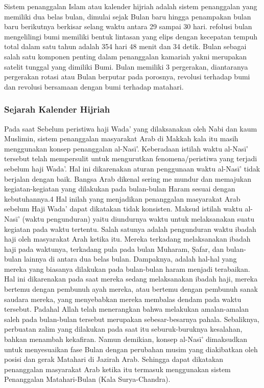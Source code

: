   Sistem penanggalan Islam atau kalender hijriah adalah sistem penanggalan yang memiliki dua belas bulan, dimulai sejak Bulan baru hingga penampakan bulan baru berikutnya berkisar selang waktu antara 29 sampai 30 hari. refolusi bulan mengelilingi bumi memiliki bentuk lintasan yang elips dengan kecepatan tempuh total dalam satu tahun adalah 354 hari 48 menit dan 34 detik.
  Bulan sebagai salah satu komponen penting dalam penanggalan kamariah yakni merupakan satelit tunggal yang dimiliki Bumi. Bulan memiliki 3 pergerakan, diantaranya pergerakan rotasi atau Bulan berputar pada porosnya, revolusi terhadap bumi dan revolusi bersamaan dengan bumi terhadap matahari.

    \subsubsection{Sejarah Kalender Hijriah}\cite{setyanto2015kriteria}
      Pada saat Sebelum peristiwa haji Wada’ yang dilaksanakan oleh Nabi dan kaum Muslimin, sistem penanggalan masyarakat Arab di Makkah kala itu masih menggunakan konsep penanggalan al-Nasī’. Keberadaan istilah waktu al-Nasī’ tersebut telah mempersulit untuk mengurutkan fenomena/peristiwa yang terjadi sebelum haji Wada’.
    Hal ini dikarenakan aturan penggunaan waktu al-Nasī’ tidak berjalan dengan baik. Bangsa Arab dikenal sering me mundur dan memajukan kegiatan-kegiatan yang dilakukan pada bulan-bulan Haram sesuai dengan kebutuhannya.4 Hal inilah yang menjadikan penanggalan masyarakat Arab sebelum Haji Wada’ dapat dikatakan tidak konsisten.
    Maksud istilah waktu al-Nasī’ (waktu pengunduran) yaitu diundurnya waktu untuk melaksanakan suatu kegiatan pada waktu tertentu. Salah satunya adalah pengunduran waktu ibadah haji oleh masyarakat Arah ketika itu. Mereka terkadang melaksanakan ibadah haji pada waktunya, terkadang pula pada bulan Muharam, Ṣafar, dan bulan-bulan lainnya di antara dua belas bulan.
    Dampaknya, adalah hal-hal yang mereka yang biasanya dilakukan pada bulan-bulan haram menjadi terabaikan. Hal ini dikarenakan pada saat mereka sedang melaksanakan ibadah haji, mereka bertemu dengan pembunuh ayah mereka, atau bertemu dengan pembunuh sanak saudara mereka, yang menyebabkan mereka membalas dendam pada waktu tersebut.
    Padahal Allah telah menerangkan bahwa melakukan amalan-amalan saleh pada bulan-bulan tersebut merupakan sebesar-besarnya pahala. Sebaliknya, perbuatan zalim yang dilakukan pada saat itu seburuk-buruknya kesalahan, bahkan menambah kekafiran.
    Namun demikian, konsep al-Nasī’ dimaksudkan untuk menyesuaikan fase Bulan dengan perubahan musim yang diakibatkan oleh posisi dan gerak Matahari di Jazirah Arab. Sehingga dapat dikatakan penanggalan masyarakat Arab ketika itu termasuk menggunakan sistem Penanggalan Matahari-Bulan (Kala Surya-Chandra).
